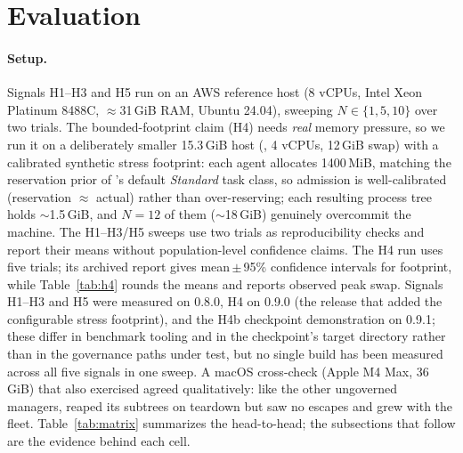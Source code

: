 \section{Evaluation}
\label{sec:eval}

\paragraph{Setup.} Signals H1--H3 and H5 run on an AWS  reference host (8 vCPUs,
Intel Xeon Platinum 8488C, $\approx$31\,GiB RAM, Ubuntu 24.04), sweeping $N \in \{1,5,10\}$ over two
trials. The bounded-footprint claim (H4) needs \emph{real} memory pressure, so we run it on a
deliberately smaller 15.3\,GiB host (, 4 vCPUs, 12\,GiB swap) with a calibrated
synthetic stress footprint: each agent allocates 1400\,MiB, matching the reservation prior of
\sys{}'s default \emph{Standard} task class, so admission is well-calibrated (reservation
$\approx$ actual) rather than over-reserving; each resulting process tree holds $\sim$1.5\,GiB, and
$N{=}12$ of them ($\sim$18\,GiB) genuinely overcommit the machine. The H1--H3/H5 sweeps use two
trials as reproducibility checks and report their means without population-level confidence claims.
The H4 run uses five trials; its archived report gives mean\,$\pm$\,95\% confidence intervals for footprint, while
Table~\ref{tab:h4} rounds the means and reports observed peak swap. Signals H1--H3 and H5 were measured
on \sys{} 0.8.0, H4 on 0.9.0 (the release that added the configurable stress footprint), and the
H4b checkpoint demonstration on 0.9.1; these differ in benchmark tooling and in the checkpoint's
target directory rather than in the governance paths under test, but no single build has been
measured across all five signals in one sweep. A macOS
cross-check (Apple M4 Max, 36\,GiB) that also exercised  agreed qualitatively: like the
other ungoverned managers,  reaped its subtrees on teardown but saw no escapes and grew
with the fleet. Table~\ref{tab:matrix} summarizes the head-to-head; the subsections that follow are
the evidence behind each cell.


